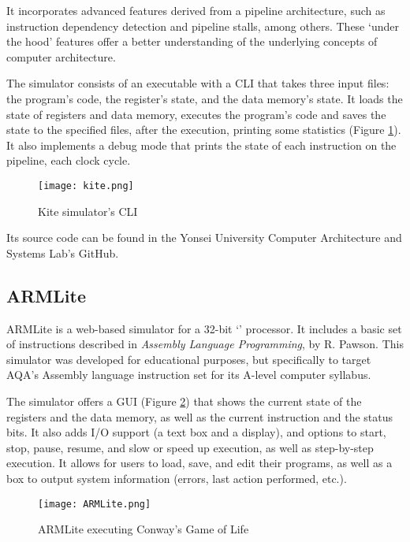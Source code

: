It incorporates advanced features derived from a \gls{pipeline} architecture, such as \gls{instruction dependency} detection and \gls{pipeline stalls}, among others. These `under the hood' features offer a better understanding of the underlying concepts of computer architecture.

The simulator consists of an executable with a \gls{CLI} that takes three input files: the program's code, the register's state, and the data \gls{memory}'s state. It loads the state of registers and data \gls{memory}, executes the program's code and saves the state to the specified files, after the execution, printing some statistics (Figure \ref{fig:kite}). It also implements a \gls{debug} mode that prints the state of each instruction on the \gls{pipeline}, each \gls{clock cycle}.

\begin{figure}[h]
  \caption[Kite simulator's CLI]{Kite simulator's \gls{CLI}}
  \texttt{[image: kite.png]}
  \label{fig:kite}
\end{figure}

Its source code can be found in the Yonsei University Computer Architecture and Systems Lab's GitHub\supercite{kiteGH}.


\subsection*{ARMLite}\label{subsubsec:armlite}
ARMLite\supercite{ARMLite} is a web-based simulator for a 32-bit `' processor. It includes a basic set of instructions described in \textit{Assembly Language Programming}\supercite{PawsonRichard.2020Ass}, by R. Pawson. This simulator was developed for educational purposes, but specifically to target AQA\supercite{AQA}'s Assembly language instruction set for its A-level computer syllabus\supercite{AQAInstructionSet}.

The simulator offers a \gls{GUI} (Figure \ref{fig:armlite}) that shows the current state of the \glspl{register} and the data \gls{memory}, as well as the current instruction and the status bits. It also adds \gls{I/O} support (a text box and a display), and options to start, stop, pause, resume, and slow or speed up execution, as well as step-by-step execution. It allows for users to load, save, and edit their programs, as well as a box to output system information (errors, last action performed, etc.).

\begin{figure}[h]
  \caption[ARMLite executing Conway's Game of Life]{ARMLite executing Conway's Game of Life\normalfont\supercite{Gardner1970fantastic}}
  \texttt{[image: ARMLite.png]}
  \label{fig:armlite}
\end{figure}

